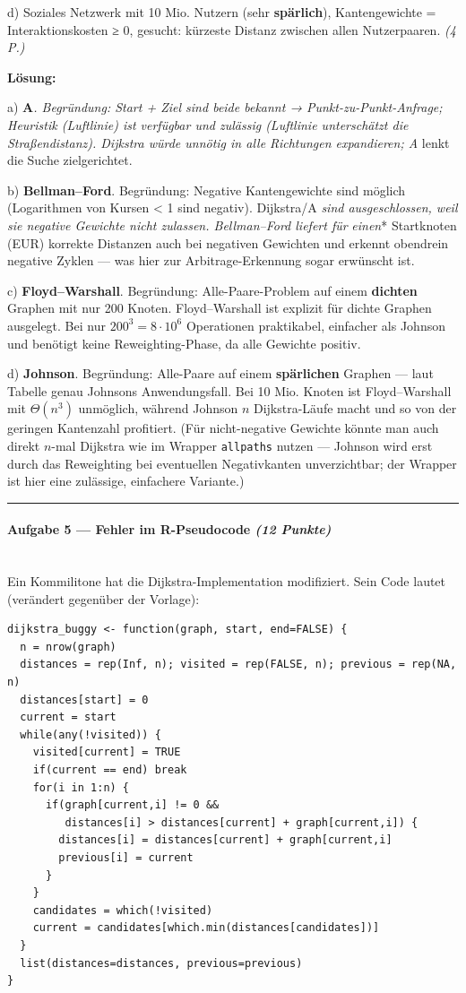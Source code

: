 \documentclass[11pt, a4paper]{article}
\begin{document}
d) Soziales Netzwerk mit 10 Mio. Nutzern (sehr \textbf{spärlich}), Kantengewichte = Interaktionskosten ≥ 0, gesucht: kürzeste Distanz zwischen allen Nutzerpaaren. \textit{(4 P.)}


\textbf{Lösung:}


a) \textbf{A}\textit{. Begründung: Start + Ziel sind beide bekannt → Punkt-zu-Punkt-Anfrage; Heuristik (Luftlinie) ist verfügbar und zulässig (Luftlinie unterschätzt die Straßendistanz). Dijkstra würde unnötig in alle Richtungen expandieren; A} lenkt die Suche zielgerichtet.


b) \textbf{Bellman–Ford}. Begründung: Negative Kantengewichte sind möglich (Logarithmen von Kursen < 1 sind negativ). Dijkstra/A\textit{ sind ausgeschlossen, weil sie negative Gewichte nicht zulassen. Bellman–Ford liefert für }\textit{einen}* Startknoten (EUR) korrekte Distanzen auch bei negativen Gewichten und erkennt obendrein negative Zyklen — was hier zur Arbitrage-Erkennung sogar erwünscht ist.


c) \textbf{Floyd–Warshall}. Begründung: Alle-Paare-Problem auf einem \textbf{dichten} Graphen mit nur 200 Knoten. Floyd–Warshall ist explizit für dichte Graphen ausgelegt. Bei nur $200^3 = 8\cdot10^6$ Operationen praktikabel, einfacher als Johnson und benötigt keine Reweighting-Phase, da alle Gewichte positiv.


d) \textbf{Johnson}. Begründung: Alle-Paare auf einem \textbf{spärlichen} Graphen — laut Tabelle genau Johnsons Anwendungsfall. Bei 10 Mio. Knoten ist Floyd–Warshall mit $\Theta(n^3)$ unmöglich, während Johnson $n$ Dijkstra-Läufe macht und so von der geringen Kantenzahl profitiert. (Für nicht-negative Gewichte könnte man auch direkt $n$-mal Dijkstra wie im Wrapper \texttt{allpaths} nutzen — Johnson wird erst durch das Reweighting bei eventuellen Negativkanten unverzichtbar; der Wrapper ist hier eine zulässige, einfachere Variante.)



\noindent\textcolor{rulegray}{\rule{\linewidth}{0.4pt}}


\paragraph{Aufgabe 5 — Fehler im R-Pseudocode \textit{(12 Punkte)}}\mbox{}\\[2pt]

Ein Kommilitone hat die Dijkstra-Implementation modifiziert. Sein Code lautet (verändert gegenüber der Vorlage):


\begin{lstlisting}
dijkstra_buggy <- function(graph, start, end=FALSE) {
  n = nrow(graph)
  distances = rep(Inf, n); visited = rep(FALSE, n); previous = rep(NA, n)
  distances[start] = 0
  current = start
  while(any(!visited)) {
    visited[current] = TRUE
    if(current == end) break
    for(i in 1:n) {
      if(graph[current,i] != 0 &&
         distances[i] > distances[current] + graph[current,i]) {
        distances[i] = distances[current] + graph[current,i]
        previous[i] = current
      }
    }
    candidates = which(!visited)
    current = candidates[which.min(distances[candidates])]
  }
  list(distances=distances, previous=previous)
}
\end{lstlisting}
\end{document}
